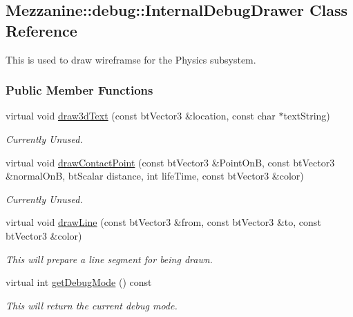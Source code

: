 \hypertarget{classMezzanine_1_1debug_1_1InternalDebugDrawer}{
\subsection{Mezzanine::debug::InternalDebugDrawer Class Reference}
\label{classMezzanine_1_1debug_1_1InternalDebugDrawer}
}


This is used to draw wireframse for the Physics subsystem.  


\subsubsection*{Public Member Functions}
\begin{DoxyCompactItemize}
\item 
virtual void \hyperlink{classMezzanine_1_1debug_1_1InternalDebugDrawer_aaec96d2b633e9890ac4d4bd28816e7b6}{draw3dText} (const btVector3 \&location, const char $\ast$textString)
\begin{DoxyCompactList}\small\item\em Currently Unused. \item\end{DoxyCompactList}\item 
virtual void \hyperlink{classMezzanine_1_1debug_1_1InternalDebugDrawer_aab7fbeabbd7ddb67d5388fdd5673c005}{drawContactPoint} (const btVector3 \&PointOnB, const btVector3 \&normalOnB, btScalar distance, int lifeTime, const btVector3 \&color)
\begin{DoxyCompactList}\small\item\em Currently Unused. \item\end{DoxyCompactList}\item 
virtual void \hyperlink{classMezzanine_1_1debug_1_1InternalDebugDrawer_af557ecfa759edf32dfc3c8dd3dc15a0b}{drawLine} (const btVector3 \&from, const btVector3 \&to, const btVector3 \&color)
\begin{DoxyCompactList}\small\item\em This will prepare a line segment for being drawn. \item\end{DoxyCompactList}\item 
virtual int \hyperlink{classMezzanine_1_1debug_1_1InternalDebugDrawer_a988d8362fbfd5e45032010334777d02d}{getDebugMode} () const 
\begin{DoxyCompactList}\small\item\em This will return the current debug mode. \item\end{DoxyCompactList}\item 

\end{DoxyCompactItemize}
